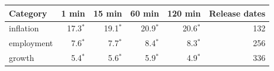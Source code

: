\begin{tabular}{lrrrrr}
\toprule
Category & 1 min & 15 min & 60 min & 120 min & Release dates \\
\midrule
inflation & 17.3$^{*}$ & 19.1$^{*}$ & 20.9$^{*}$ & 20.6$^{*}$ & 132 \\
employment & 7.6$^{*}$ & 7.7$^{*}$ & 8.4$^{*}$ & 8.3$^{*}$ & 256 \\
growth & 5.4$^{*}$ & 5.6$^{*}$ & 5.9$^{*}$ & 4.9$^{*}$ & 336 \\
\bottomrule
\end{tabular}
